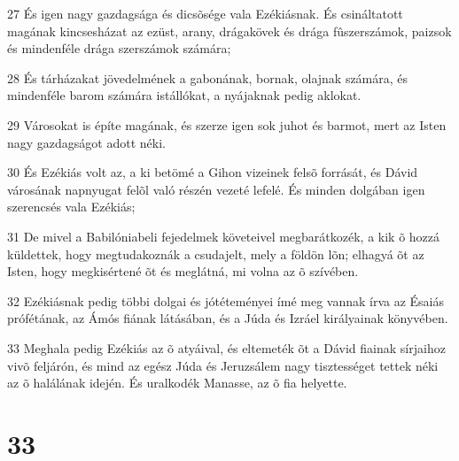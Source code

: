 \par 27 És igen nagy gazdagsága és dicsõsége vala Ezékiásnak. És csináltatott magának kincsesházat az ezüst, arany, drágakövek és drága fûszerszámok, paizsok és mindenféle drága szerszámok számára;
\par 28 És tárházakat jövedelmének a gabonának, bornak, olajnak számára, és mindenféle barom számára istállókat, a nyájaknak pedig aklokat.
\par 29 Városokat is építe magának, és szerze igen sok juhot és barmot, mert az Isten nagy gazdagságot adott néki.
\par 30 És Ezékiás volt az, a ki betömé a Gihon vizeinek felsõ forrását, és Dávid városának napnyugat felõl való részén vezeté lefelé. És minden dolgában igen szerencsés vala Ezékiás;
\par 31 De mivel a Babilóniabeli fejedelmek követeivel megbarátkozék, a kik õ hozzá küldettek, hogy megtudakoznák a csudajelt, mely a földön lõn; elhagyá õt az Isten, hogy megkisértené õt és meglátná, mi volna az õ szívében.
\par 32 Ezékiásnak pedig többi dolgai és jótéteményei ímé meg vannak írva az Ésaiás prófétának, az Ámós fiának látásában, és a Júda és Izráel királyainak könyvében.
\par 33 Meghala pedig Ezékiás az õ atyáival, és eltemeték õt a Dávid fiainak sírjaihoz vivõ feljárón, és mind az egész Júda és Jeruzsálem nagy tisztességet tettek néki az õ halálának idején. És uralkodék Manasse, az õ fia helyette.

\chapter{33}

